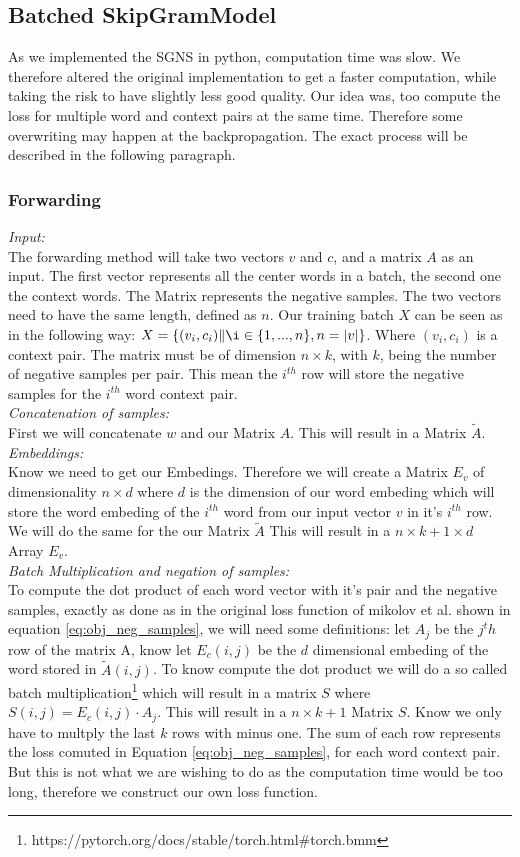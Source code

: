 \subsection{Batched SkipGramModel}
As we implemented the SGNS in python, computation time was slow. We therefore altered the original implementation to get a faster computation, while taking the risk to have slightly less good quality. Our idea was, too compute the loss for multiple word and context pairs at the same time. Therefore some overwriting may happen at the backpropagation. The exact process will be described in the following paragraph. 
\subsubsection{Forwarding}
\textit{Input:}\\
The forwarding method will take two vectors $v$ and $c$, and a matrix $A$ as an input. The first vector represents all the center words in a batch, the second one the context words. The Matrix represents the negative samples. The two vectors need to have the same length, defined as $n$. Our training batch $X$ can be seen as in the following way:  $X = \{(v_i, c_i)\|\i \in \{1, ..., n\}, n = |v| \}$. Where $(v_i,c_i)$ is a context pair. The matrix must be of dimension $n \times k$, with $k$, being the number of negative samples per pair. This mean the $i^{th}$ row will store the negative samples for the $i^{th}$ word context pair.\\
\textit{Concatenation of samples:}\\
First we will concatenate $w$ and our Matrix $A$. This will result in a Matrix $\tilde{A}$.\\
\textit{Embeddings:}\\
 Know we need to get our Embedings. Therefore we will create a Matrix $E_v$ of dimensionality $n \times d$ where $d$ is the dimension of our word embeding which will store the word embeding of the $i^{th}$ word from our input vector $v$ in it's $i^{th}$ row. We will do the same for the our Matrix $\tilde{A}$ This will result in a $n \times k+1 \times d$ Array $E_v$. \\
 \textit{Batch Multiplication and negation of samples:}\\ 
 To compute the dot product of each word vector with it's pair and the negative samples, exactly as done as in the original loss function of mikolov et al. shown in equation \ref{eq:obj_neg_samples}, we will need some definitions: let $A_j$ be the $j^th$ row of the matrix A, know let $E_c(i,j)$ be the $d$ dimensional embeding of the word stored in $\tilde{A}(i,j)$. To know compute the dot product we will do a so called batch multiplication\footnote{https://pytorch.org/docs/stable/torch.html\#torch.bmm} which will result in a matrix $S$ where $S(i,j) = E_c(i,j) \cdot A_j$. This will result in a $n\times k+1$ Matrix $S$. Know we only have to multply the last $k$ rows with minus one. The sum of each row represents the loss comuted in Equation \ref{eq:obj_neg_samples}, for each word context pair. But this is not what we are wishing to do as the computation time would be too long, therefore we construct our own loss function. \\
